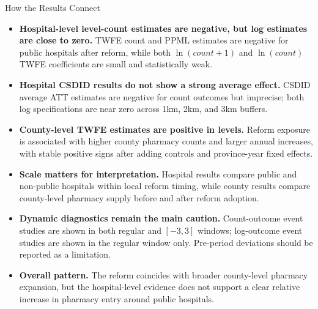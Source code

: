 \documentclass{beamer}
\begin{document}
\begin{frame}{How the Results Connect}

\scriptsize
\begin{itemize}\setlength\itemsep{0.45em}
    \item \textbf{Hospital-level level-count estimates are negative, but log estimates are close to zero.}
    TWFE count and PPML estimates are negative for public hospitals after reform, while both $\ln(count+1)$ and $\ln(count)$ TWFE coefficients are small and statistically weak.

    \item \textbf{Hospital CSDID results do not show a strong average effect.}
    CSDID average ATT estimates are negative for count outcomes but imprecise; both log specifications are near zero across 1km, 2km, and 3km buffers.

    \item \textbf{County-level TWFE estimates are positive in levels.}
    Reform exposure is associated with higher county pharmacy counts and larger annual increases, with stable positive signs after adding controls and province-year fixed effects.

    \item \textbf{Scale matters for interpretation.}
    Hospital results compare public and non-public hospitals within local reform timing, while county results compare county-level pharmacy supply before and after reform adoption.

    \item \textbf{Dynamic diagnostics remain the main caution.}
    Count-outcome event studies are shown in both regular and $[-3,3]$ windows; log-outcome event studies are shown in the regular window only. Pre-period deviations should be reported as a limitation.

    \item \textbf{Overall pattern.}
    The reform coincides with broader county-level pharmacy expansion, but the hospital-level evidence does not support a clear relative increase in pharmacy entry around public hospitals.
\end{itemize}

\end{frame}
\end{document}
